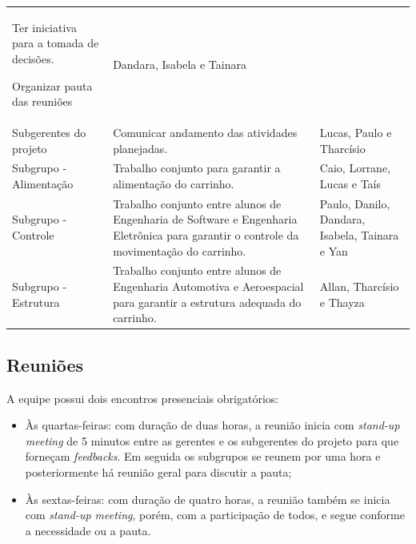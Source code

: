 \begin{table}[h]
{\begin{tabular}{ l l l }
{Ter iniciativa para a tomada de decisões.  			

Organizar pauta das reuniões } &
    \multicolumn{1}{p{2.417cm}|}{Dandara, Isabela e Tainara}
  \\  
  \cline{1-1}\cline{2-2}\cline{3-3}  
    \multicolumn{1}{|p{2.567cm}|}{Subgerentes do projeto} &
    \multicolumn{1}{p{6.433cm}|}{Comunicar andamento das atividades planejadas.} &
    \multicolumn{1}{p{2.417cm}|}{Lucas, Paulo e Tharcísio}
  \\  
  \cline{1-1}\cline{2-2}\cline{3-3}  
    \multicolumn{1}{|p{2.567cm}|}{Subgrupo - Alimentação} &
    \multicolumn{1}{p{6.433cm}|}{Trabalho conjunto para garantir a alimentação do carrinho.} &
    \multicolumn{1}{p{2.417cm}|}{Caio, Lorrane, Lucas e Taís}
  \\  
  \cline{1-1}\cline{2-2}\cline{3-3}  
    \multicolumn{1}{|p{2.567cm}|}{Subgrupo - Controle} &
    \multicolumn{1}{p{6.433cm}|}{Trabalho conjunto entre alunos de Engenharia de Software e Engenharia Eletrônica para garantir o controle da movimentação do carrinho. } &
    \multicolumn{1}{p{2.417cm}|}{Paulo, Danilo, Dandara, Isabela, Tainara e Yan}
  \\  
  \cline{1-1}\cline{2-2}\cline{3-3}  
    \multicolumn{1}{|p{2.567cm}|}{Subgrupo - Estrutura} &
    \multicolumn{1}{p{6.433cm}|}{Trabalho conjunto entre alunos de Engenharia Automotiva e Aeroespacial para garantir a estrutura adequada do carrinho.} &
    \multicolumn{1}{p{2.417cm}|}{Allan, Tharcísio e Thayza}
  \\  
  \hline

 \end{tabular} }
\end{table}

\newpage

\subsection{Reuniões}

A equipe possui dois encontros presenciais obrigatórios:

\begin{itemize}
  \item Às quartas-feiras: com duração de duas horas, a reunião inicia com \textit{stand-up meeting} de 5 minutos entre as gerentes e os subgerentes do projeto para que forneçam \textit{feedbacks}. Em seguida os subgrupos se reunem por uma hora e posteriormente há reunião geral para discutir a pauta;
  \item Às sextas-feiras: com duração de quatro horas, a reunião também se inicia com \textit{stand-up meeting}, porém, com a participação de todos, e segue conforme a necessidade ou a pauta.
\end{itemize}

